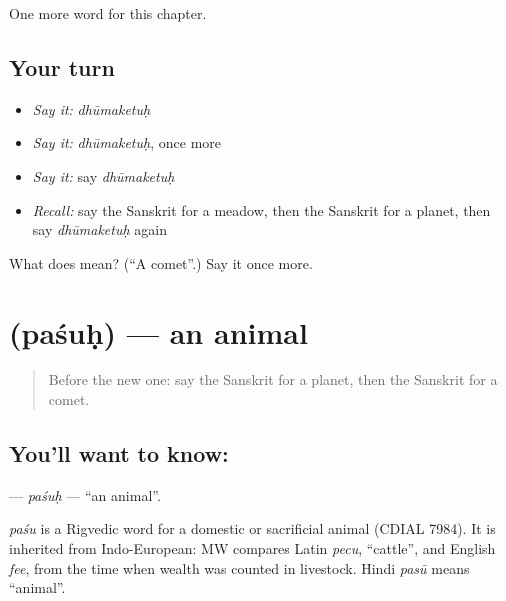 \begin{grammarlens}[title={What you've built}]
One more word for this chapter.
\end{grammarlens}

\subsection*{Your turn}
\begin{itemize}
\raggedright
  \item \emph{Say it:} \emph{dhūmaketuḥ}
  \item \emph{Say it:} \emph{dhūmaketuḥ}, once more
  \item \emph{Say it:} say \emph{dhūmaketuḥ}
  \item \emph{Recall:} say the Sanskrit for a meadow, then the Sanskrit for a planet, then say \emph{dhūmaketuḥ} again
\end{itemize}

\begin{tcolorbox}[breakable,colback=teal!4,colframe=teal!35!black,title={Before you move on}]
What does  mean? (\textquotedblleft{}A comet\textquotedblright{}.) Say it once more.
\end{tcolorbox}
\section[\texorpdfstring{\sk{पशुः} (paśuḥ)}{पशुः (paśuḥ)}]{ (paśuḥ) — an animal}

\label{lesson:SA-C226-pasuh}



\begin{quote}
Before the new one: say the Sanskrit for a planet, then the Sanskrit for a comet.
\end{quote}

\subsection*{You'll want to know: }
\textbf{} — \emph{paśuḥ} — \textquotedblleft{}an animal\textquotedblright{}.

\begin{cousinweb}
\emph{paśu} is a Rigvedic word for a domestic or sacrificial animal (CDIAL 7984). It is inherited from Indo-European: MW compares Latin \emph{pecu}, \textquotedblleft{}cattle\textquotedblright{}, and English \emph{fee}, from the time when wealth was counted in livestock. Hindi \emph{pasū} means \textquotedblleft{}animal\textquotedblright{}.
\end{cousinweb}

